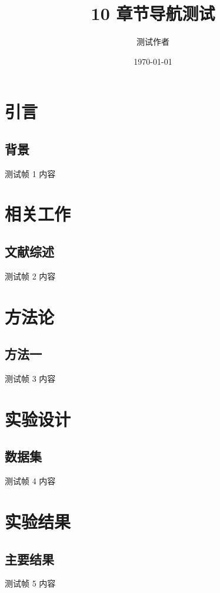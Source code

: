 \documentclass[aspectratio=169, hyperref, UTF8, CJK]{beamer}
\title{10 章节导航测试}
\author{测试作者}
\institute{北京理工大学}
\date{\today}
\begin{document}
\section{引言}
\subsection{背景}
\begin{frame}{测试帧 1}
  内容
\end{frame}

\section{相关工作}
\subsection{文献综述}
\begin{frame}{测试帧 2}
  内容
\end{frame}

\section{方法论}
\subsection{方法一}
\begin{frame}{测试帧 3}
  内容
\end{frame}

\section{实验设计}
\subsection{数据集}
\begin{frame}{测试帧 4}
  内容
\end{frame}

\section{实验结果}
\subsection{主要结果}
\begin{frame}{测试帧 5}
  内容
\end{frame}
\end{document}
